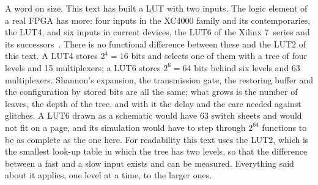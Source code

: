 \documentclass[11pt,a4paper]{article}
\begin{document}
A word on size. This text has built a LUT with two inputs. The logic
element of a real FPGA has more: four inputs in the XC4000 family and
its contemporaries, the LUT4, and six inputs in current devices, the
LUT6 of the Xilinx 7~series and its successors~\cite{Xilinx4000,
Xilinx7}. There is no functional difference between these and the LUT2
of this text. A LUT4 stores $2^4=16$ bits and selects one of them with
a tree of four levels and 15 multiplexers; a LUT6 stores $2^6=64$ bits
behind six levels and 63 multiplexers. Shannon's expansion, the
transmission gate, the restoring buffer and the configuration by
stored bits are all the same; what grows is the number of leaves, the
depth of the tree, and with it the delay and the care needed against
glitches. A LUT6 drawn as a schematic would have 63 switch sheets and
would not fit on a page, and its simulation would have to step through
$2^{64}$ functions to be as complete as the one here. For readability
this text uses the LUT2, which is the smallest look-up table in which
the tree has two levels, so that the difference between a fast and a
slow input exists and can be measured. Everything said about it
applies, one level at a time, to the larger ones.
\end{document}
